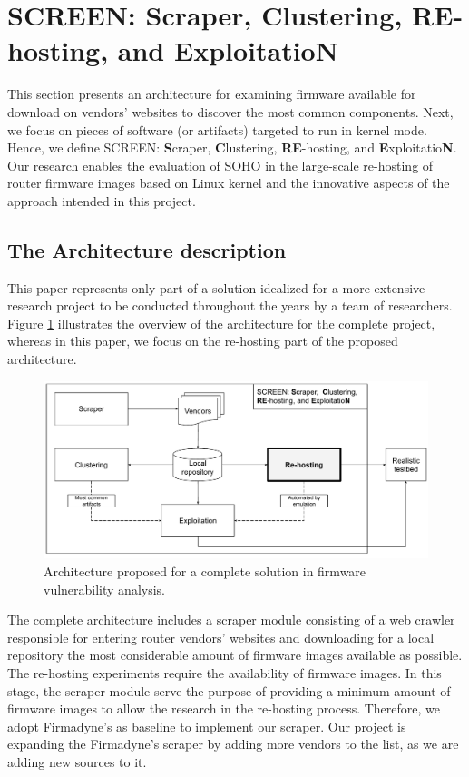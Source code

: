 \documentclass[12pt]{article}
\begin{document}
\section{SCREEN: {\bf S}craper, {\bf C}lustering, {\bf RE}-hosting, and {\bf E}xploitatio{\bf N}}
\label{sec:methodology}

This section presents an architecture for examining firmware available for download on vendors' websites to discover the most common components. Next, we focus on pieces of software (or artifacts) targeted to run in kernel mode.  Hence, we define SCREEN: {\bf S}craper, {\bf C}lustering, {\bf RE}-hosting, and {\bf E}xploitatio{\bf N}.  Our research enables the evaluation of SOHO in the large-scale re-hosting of router firmware images based on Linux kernel and the innovative aspects of the approach intended in this project.


\subsection{The Architecture description}
This paper represents only part of a solution idealized for a more extensive research project to be conducted throughout the years by a team of researchers. Figure \ref{fig:architecture} illustrates the overview of the architecture for the complete project, whereas in this paper, we focus on the re-hosting part of the proposed architecture.

\begin{figure}[h]
    \centering
    \includegraphics[width=\textwidth]{figs/screen}
    \caption{Architecture proposed for a complete solution in firmware vulnerability analysis.}
    \label{fig:architecture}
\end{figure}

The complete architecture includes a scraper module consisting of a web crawler responsible for entering router vendors' websites and downloading for a local repository the most considerable amount of firmware images available as possible. The re-hosting experiments require the availability of firmware images. In this stage, the scraper module serve the purpose of providing a minimum amount of firmware images to allow the research in the re-hosting process. Therefore, we adopt Firmadyne's \cite{firmadyne} as baseline to implement our scraper.  Our project is expanding the Firmadyne's scraper by adding more vendors to the list, as we are adding new sources to it.
\end{document}
